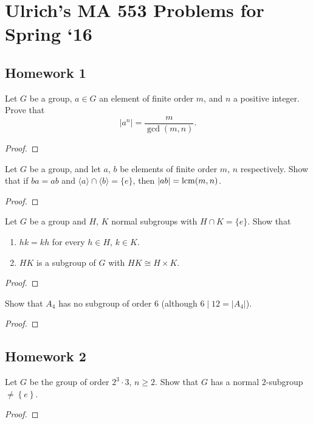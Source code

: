 \chapter{Ulrich's MA 553 Problems for Spring `16}
\section{Homework 1}
\begin{problem}
Let $G$ be a group, $a\in G$ an element of finite order $m$, and $n$ a
positive integer. Prove that
\[
|a^n|=\frac{m}{\gcd(m,n)}.
\]
\end{problem}
\begin{proof}

\end{proof}

\begin{problem}
Let $G$ be a group, and let $a$, $b$ be elements of finite order $m$, $n$
respectively. Show that if $ba=ab$ and $\langle a\rangle\cap\langle
b\rangle=\{e\}$, then $|ab|=\operatorname{lcm}(m,n)$.
\end{problem}
\begin{proof}
\end{proof}

\begin{problem}
Let $G$ be a group and $H$, $K$ normal subgroups with $H\cap K=\{e\}$. Show
that
\begin{enumerate}[label=(\alph*)]
\item $hk=kh$ for every $h\in H$, $k\in K$.
\item $HK$ is a subgroup of $G$ with $HK\cong H\times K$.
\end{enumerate}
\end{problem}
\begin{proof}
\end{proof}

\begin{problem}
Show that $A_4$ has no subgroup of order $6$ (although $6\mid 12=|A_4|$).
\end{problem}
\begin{proof}
\end{proof}

\section{Homework 2}
\begin{problem}
Let $G$ be the group of order $2^3\cdot 3$, $n\geq 2$. Show that $G$ has a
normal $2$-subgroup $\neq\left\{e\right\}$.
\end{problem}
\begin{proof}
\end{proof}

